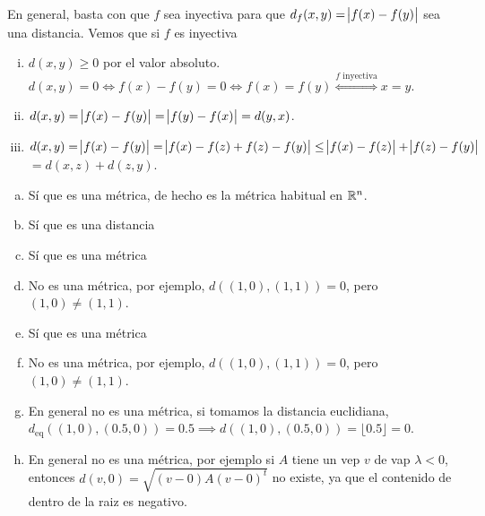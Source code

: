 \begin{ej}
	En general, basta con que $f$ sea inyectiva para que $d_f(x,y) = \abs{f(x) - f(y)}$ sea una distancia. Vemos que si $f$ es inyectiva
	\begin{enumerate}[i)]
		\item $d(x,y) \geq 0$ por el valor absoluto. $d(x, y) = 0 \iff f(x) - f(y) = 0 \iff f(x) = f(y) \stackrel{f \text{ inyectiva}}{\iff} x = y$.
		\item $d(x,y) = \abs{f(x) - f(y)} = \abs{f(y) - f(x)} = d(y,x)$.
		\item $d(x,y) = \abs{f(x) - f(y)} = \abs{f(x) - f(z) + f(z) - f(y)} \leq \abs{f(x) - f(z)} + \abs{f(z) - f(y)}$ $ = d(x, z) + d(z, y)$.
	\end{enumerate}
\end{ej}

\begin{ej}
	\begin{enumerate}[(a)]
		\item Sí que es una m\'etrica, de hecho es la m\'etrica habitual en $\mathbb{R}^n$.
			\begin{center}
				
			\end{center}
		\item Sí que es una distancia
			\begin{center}
				
			\end{center}
		\item Sí que es una m\'etrica
			\begin{center}
				
			\end{center}
		\item No es una m\'etrica, por ejemplo, $d\left( (1,0), (1,1) \right) = 0$, pero $(1,0) \neq (1,1)$.
		\item Sí que es una m\'etrica
			\begin{center}
				
			\end{center}
		\item No es una m\'etrica, por ejemplo, $d\left( (1,0), (1,1) \right) = 0$, pero $(1,0) \neq (1,1)$.
		\item En general no  es una m\'etrica, si tomamos la distancia euclidiana, $d_{\text{eq}} \left( (1, 0) , (0.5, 0) \right) = 0.5 \implies
			d\left( (1,0), (0.5, 0) \right) = \lfloor0.5 \rfloor = 0$.
		\item En general no es una m\'etrica, por ejemplo si $A$ tiene un vep $v$ de vap $\lambda < 0$, entonces $d(v, 0) = \sqrt{(v - 0) A (v-0)^t}$ no existe,
			ya que el contenido de dentro de la raiz es negativo.

\end{enumerate}
\end{ej}
